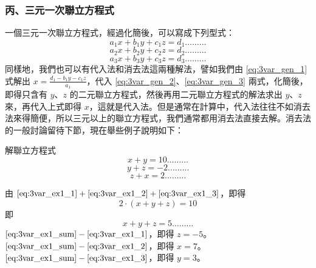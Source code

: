 \subsubsection*{丙、三元一次聯立方程式}\label{subsec:4-3-c}

一個三元一次聯立方程式，經過化簡後，可以寫成下列型式：
\begin{equation}\label{eq:3var_gen_1}
  a_1 x + b_1 y + c_1 z = d_1 \dots\dots\dots
\end{equation}
\begin{equation}\label{eq:3var_gen_2}
  a_2 x + b_2 y + c_2 z = d_2 \dots\dots\dots
\end{equation}
\begin{equation}\label{eq:3var_gen_3}
  a_3 x + b_3 y + c_3 z = d_3 \dots\dots\dots
\end{equation}
同樣地，我們也可以有代入法和消去法這兩種解法，譬如我們由 \eqref{eq:3var_gen_1} 式解出 $x = \frac{d_1 - b_1 y - c_1 z}{a_1}$，代入 \eqref{eq:3var_gen_2}、\eqref{eq:3var_gen_3} 兩式，化簡後，即得只含有 $y$、$z$ 的二元聯立方程式，然後再用二元聯立方程式的解法求出 $y$、$z$ 來，再代入上式即得 $x$，這就是代入法。但是通常在計算中，代入法往往不如消去法來得簡便，所以三元以上的聯立方程式，我們通常都用消去法直接去解。消去法的一般討論留待下節，現在舉些例子說明如下：

\begin{example}\label{ex:4-3-6}
解聯立方程式
\begin{equation}\label{eq:3var_ex1_1}
  x+y = 10 \dots\dots\dots
\end{equation}
\begin{equation}\label{eq:3var_ex1_2}
  y+z = -2 \dots\dots\dots
\end{equation}
\begin{equation}\label{eq:3var_ex1_3}
  z+x = 2 \dots\dots\dots
\end{equation}
\end{example}

\begin{solution*}
由 $\eqref{eq:3var_ex1_1} + \eqref{eq:3var_ex1_2} + \eqref{eq:3var_ex1_3}$\footnotemark，即得
\begin{equation*}
  2 \cdot (x+y+z) = 10
\end{equation*}
即
\begin{equation}\label{eq:3var_ex1_sum}
  x+y+z = 5 \dots\dots\dots
\end{equation}
$\eqref{eq:3var_ex1_sum} - \eqref{eq:3var_ex1_1}$，即得 $z=-5$。\\
$\eqref{eq:3var_ex1_sum} - \eqref{eq:3var_ex1_2}$，即得 $x=7$。\\
$\eqref{eq:3var_ex1_sum} - \eqref{eq:3var_ex1_3}$，即得 $y=3$。
\end{solution*}

